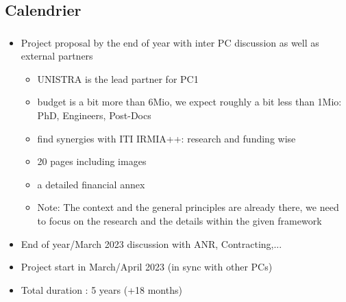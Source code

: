 \subsection{Calendrier}
\begin{frame}
  \frametitle{\insertsectionhead}

  \begin{itemize}
    \item Project proposal by the end of year with inter PC discussion as well as external partners
    \begin{itemize}
      \item UNISTRA is the lead partner for PC1
      \item budget is a bit more than 6Mio, we expect roughly a bit less than 1Mio: PhD, Engineers, Post-Docs
      \item find synergies with ITI IRMIA++: research and funding wise
      \item 20 pages including images
      \item a detailed financial annex
      \item \alert{Note}: The context and the general principles are already there, we need to focus on the research and the details within the given framework
    \end{itemize}
    \item End of year/March 2023 discussion with ANR, Contracting,...
    \item Project start in March/April 2023 (in sync with other PCs)
    \item Total duration : 5 years (+18 months)
  \end{itemize}

\end{frame}




